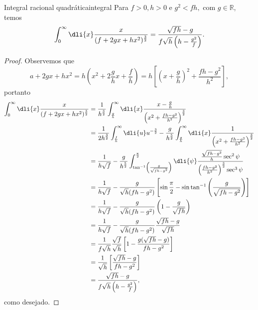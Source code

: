 \begin{lemma}{Integral racional quadrática}{integral}
    Para \(f > 0, h > 0\) e \(g^2 < fh,\) com \(g \in \mathbb{R}\), temos
    \begin{equation*}
       \int_0^\infty \dli{x} \frac{x}{(f + 2gx + hx^2)^{\frac32}} = \frac{\sqrt{fh} - g}{ f\sqrt{h} \left(h - \frac{g^2}{f}\right)}.
    \end{equation*}
\end{lemma}
\begin{proof}
   Observemos que
   \begin{equation*}
      a + 2gx + hx^2 = h \left(x^2 + 2\frac{g}{h} x + \frac{f}{h}\right) = h \left[\left(x + \frac{g}{h}\right)^2 + \frac{fh - g^2}{h^2}\right],
   \end{equation*}
   portanto
   \begin{align*}
      \int_0^\infty \dli{x} \frac{x}{(f + 2gx + hx^2)^{\frac32}} 
      &= \frac{1}{h^{\frac32}} \int_{\frac{g}{h}}^\infty \dli{x}\frac{x - \frac{g}{h}}{\left(x^2 + \frac{fh - g^2}{h^2}\right)^{\frac32}}\\
      &= \frac{1}{2h^{\frac32}} \int_{\frac{f}{h}}^{\infty} \dli{u} u^{-\frac32} - \frac{g}{h^{\frac52}} \int_{\frac{g}{h}}^\infty \dli{x}\frac{1}{\left(x^2 + \frac{fh - g^2}{h^2}\right)^{\frac32}}\\
      &= \frac{1}{h \sqrt{f}} - \frac{g}{h^{\frac52}}\int_{\tan^{-1}\left(\frac{g}{\sqrt{fh - g^2}}\right)}^{\frac\pi2} \dli{\psi} \frac{\frac{\sqrt{fh - g^2}}{h}\sec^2\psi}{\left(\frac{fh - g^2}{h^2}\right)^{\frac32} \sec^3 \psi}\\
      &= \frac{1}{h\sqrt{f}} - \frac{g}{\sqrt{h} (fh - g^2)} \left[\sin\frac{\pi}{2} - \sin \tan^{-1} \left(\frac{g}{\sqrt{fh - g^2}}\right)\right]\\
      &= \frac{1}{h\sqrt{f}} - \frac{g}{\sqrt{h} (fh - g^2)} \left(1 - \frac{g}{\sqrt{fh}}\right)\\
      &= \frac{1}{h\sqrt{f}} - \frac{g}{\sqrt{h} (fh - g^2)} \frac{\sqrt{fh} - g}{\sqrt{fh}}\\
      &= \frac{1}{f \sqrt{h}}\frac{\sqrt{f}}{\sqrt{h}} \left[1 - \frac{g (\sqrt{fh} - g)}{fh - g^2}\right]\\
      &= \frac{1}{\sqrt{h}} \left[\frac{\sqrt{fh} - g}{fh - g^2}\right]\\
      &=\frac{\sqrt{fh} - g}{ f\sqrt{h} \left(h - \frac{g^2}{f}\right)},
   \end{align*}
   como desejado.
\end{proof}
